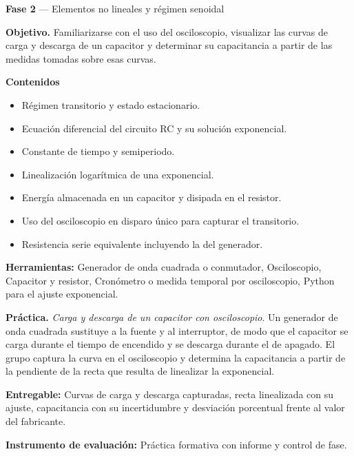 \documentclass[11pt,a4paper]{article}
\begin{document}
\begin{tcolorbox}[cajaContenido,title={Semana 8 --- Carga y descarga de un capacitor}]
\textbf{Fase 2} --- Elementos no lineales y régimen senoidal

\textbf{Objetivo.} Familiarizarse con el uso del osciloscopio, visualizar las curvas de carga y descarga de un capacitor y determinar su capacitancia a partir de las medidas tomadas sobre esas curvas.

\textbf{Contenidos}

\begin{itemize}[leftmargin=1.4em,itemsep=2pt,topsep=3pt]
  \item Régimen transitorio y estado estacionario.
  \item Ecuación diferencial del circuito RC y su solución exponencial.
  \item Constante de tiempo y semiperiodo.
  \item Linealización logarítmica de una exponencial.
  \item Energía almacenada en un capacitor y disipada en el resistor.
  \item Uso del osciloscopio en disparo único para capturar el transitorio.
  \item Resistencia serie equivalente incluyendo la del generador.
\end{itemize}

\textbf{Herramientas:} Generador de onda cuadrada o conmutador, Osciloscopio, Capacitor y resistor, Cronómetro o medida temporal por osciloscopio, Python para el ajuste exponencial.

\textbf{Práctica.} \emph{Carga y descarga de un capacitor con osciloscopio}. Un generador de onda cuadrada sustituye a la fuente y al interruptor, de modo que el capacitor se carga durante el tiempo de encendido y se descarga durante el de apagado. El grupo captura la curva en el osciloscopio y determina la capacitancia a partir de la pendiente de la recta que resulta de linealizar la exponencial.

\textbf{Entregable:} Curvas de carga y descarga capturadas, recta linealizada con su ajuste, capacitancia con su incertidumbre y desviación porcentual frente al valor del fabricante.

\textbf{Instrumento de evaluación:} Práctica formativa con informe y control de fase.
\end{tcolorbox}
\end{document}
